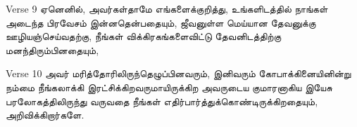 \documentclass[
  ignorenonframetext,
]{beamer}
\begin{document}
\begin{frame}{Verse 9}
\protect\hypertarget{verse-9}{}
ஏனெனில், அவர்கள்தாமே எங்களைக்குறித்து, உங்களிடத்தில் நாங்கள் அடைந்த
பிரவேசம் இன்னதென்பதையும், ஜீவனுள்ள மெய்யான தேவனுக்கு ஊழியஞ்செய்வதற்கு,
நீங்கள் விக்கிரகங்களைவிட்டு தேவனிடத்திற்கு மனந்திரும்பினதையும்,
\end{frame}

\begin{frame}{Verse 10}
\protect\hypertarget{verse-10}{}
அவர் மரித்தோரிலிருந்தெழுப்பினவரும், இனிவரும் கோபாக்கினையினின்று நம்மை
நீங்கலாக்கி இரட்சிக்கிறவருமாயிருக்கிற அவருடைய குமாரனாகிய இயேசு
பரலோகத்திலிருந்து வருவதை நீங்கள் எதிர்பார்த்துக்கொண்டிருக்கிறதையும்,
அறிவிக்கிறார்களே.
\end{frame}
\end{document}
